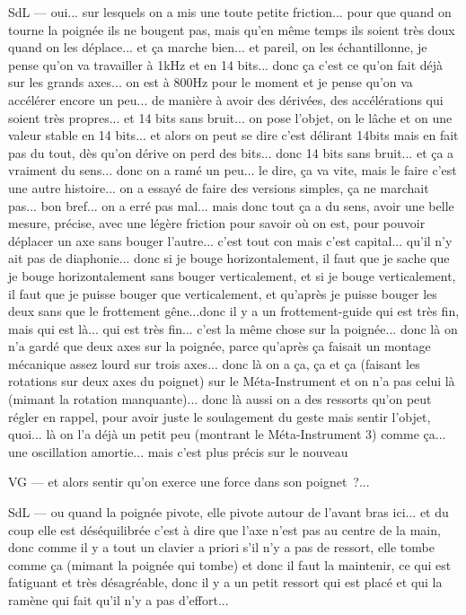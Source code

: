 SdL — oui... sur lesquels on a mis une toute petite friction... pour que quand on tourne la poignée ils ne bougent pas, mais qu'en même temps ils soient très doux quand on les déplace... et ça marche bien... et pareil, on les échantillonne, je pense qu'on va travailler à 1kHz et en 14 bits... donc ça c'est ce qu'on fait déjà sur les grands axes... on est à 800Hz pour le moment et je pense qu'on va accélérer encore un peu... de manière à avoir des dérivées, des accélérations qui soient très propres... et 14 bits sans bruit... on pose l'objet, on le lâche et on une valeur stable en 14 bits... et alors on peut se dire c'est délirant 14bits mais en fait pas du tout, dès qu'on dérive on perd des bits... donc 14 bits sans bruit... et ça a vraiment du sens... donc on a ramé un peu... le dire, ça va vite, mais le faire c'est une autre histoire... on a essayé de faire des versions simples, ça ne marchait pas... bon bref... on a erré pas mal... mais donc tout ça a du sens, avoir une belle mesure, précise, avec une légère friction pour savoir où on est, pour pouvoir déplacer un axe sans bouger l'autre... c'est tout con mais c'est capital... qu'il n'y ait pas de diaphonie... donc si je bouge horizontalement, il faut que je sache que je bouge horizontalement sans bouger verticalement, et si je bouge verticalement, il faut que je puisse bouger que verticalement, et qu'après je puisse bouger les deux sans que le frottement gêne...donc il y a un frottement-guide qui est très fin, mais qui est là... qui est très fin... c'est la même chose sur la poignée... donc là on n'a gardé que deux axes sur la poignée, parce qu'après ça faisait un montage mécanique assez lourd sur trois axes... donc là on a ça, ça et ça (faisant les rotations sur deux axes du poignet) sur le Méta-Instrument et on n'a pas celui là (mimant la rotation manquante)... donc là aussi on a des ressorts qu'on peut régler en rappel, pour avoir juste le soulagement du geste mais sentir l'objet, quoi... là on l'a déjà un petit peu (montrant le Méta-Instrument 3) comme ça... une oscillation amortie... mais c'est plus précis sur le nouveau 

VG — et alors sentir qu'on exerce une force dans son poignet ?... 

SdL — ou quand la poignée pivote, elle pivote autour de l'avant bras ici... et du coup elle est déséquilibrée c'est à dire que l'axe n'est pas au centre de la main, donc comme il y a tout un clavier a priori s'il n'y a pas de ressort, elle tombe comme ça (mimant la poignée qui tombe) et donc il faut la maintenir, ce qui est fatiguant et très désagréable, donc il y a un petit ressort qui est placé et qui la ramène qui fait qu'il n'y a pas d'effort... 

